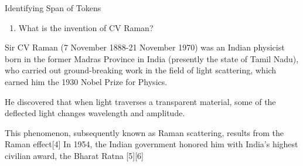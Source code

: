 \begin{frame}{Identifying Span of Tokens}
    \begin{minipage}{0.35\linewidth}
        \begin{enumerate}
            \item [] What is the invention of CV Raman?
        \end{enumerate}
    \end{minipage}
    \begin{minipage}{0.6\linewidth}

        Sir CV Raman (7 November 1888-21 November 1970) was an Indian physicist born in the former Madras Province in India (presently the state of Tamil Nadu), who carried out ground-breaking work in the field of light scattering, which earned him the 1930 Nobel Prize for Physics. \colorbox{yellow!35}{\parbox{0.98\textwidth}{\color{blue}He discovered that when light traverses a transparent material, some of the deflected light changes wavelength and amplitude.}} This phenomenon, subsequently known as Raman scattering, results from the Raman effect[4] In 1954, the Indian government honored him with India's highest civilian award, the Bharat Ratna [5][6]
    \end{minipage}
\end{frame}



